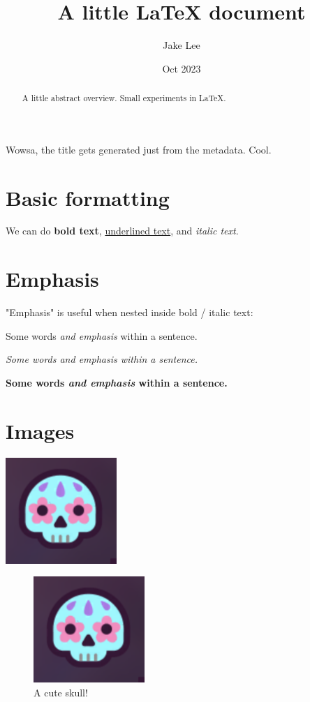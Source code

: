 \documentclass[12pt]{article}
\title{A little LaTeX document}
\author{Jake Lee}
\date{Oct 2023}
\begin{document}
\begin{abstract}
    A little abstract overview. Small experiments in LaTeX.
\end{abstract}

\maketitle 
\tableofcontents 

Wowsa, the title gets generated just from the metadata. Cool.

\section{Basic formatting}
We can do \textbf{bold text}, \underline{underlined text}, and \textit{italic text}.

\section{Emphasis}
"Emphasis" is useful when nested inside bold / italic text:

Some words \emph{and emphasis} within a sentence.

\textit{Some words \emph{and emphasis} within a sentence.}

\textbf{Some words \emph{and emphasis} within a sentence.}

\section{Images}
\includegraphics{skull}

\begin{figure}
    \centering
    \includegraphics{skull}
    \caption{A cute skull!}
    \label{fig:skull}
\end{figure}
\end{document}
